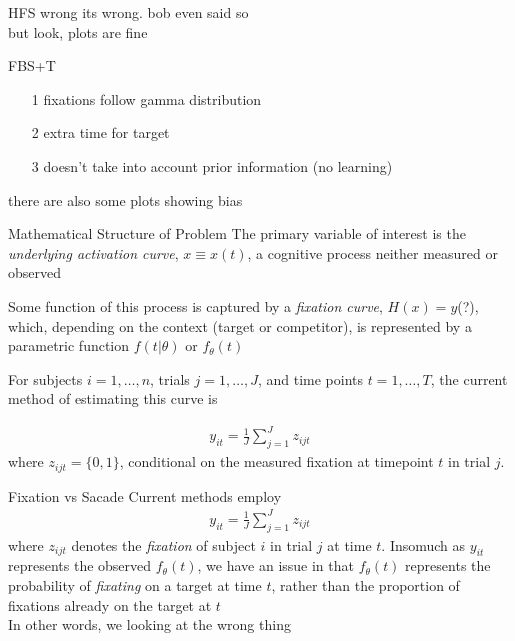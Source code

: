 \documentclass{beamer}
\begin{document}
\begin{frame}{HFS wrong}
its wrong. bob even said so \newline \\

but look, plots are fine
\end{frame}

\begin{frame}{FBS+T}
\begin{enumerate}
  \item[1] fixations follow gamma distribution
  \item[2] extra time for target
  \item[3] doesn't take into account prior information (no learning)
\end{enumerate}
\vspace{5mm}
there are also some plots showing bias
\end{frame}

\begin{frame}{Mathematical Structure of Problem}
The primary variable of interest is the \textit{underlying activation curve}, $x \equiv x(t)$, a cognitive process neither measured or observed \newline

Some function of this process is captured by a \textit{fixation curve}, $H(x) = y$(?), which, depending on the context (target or competitor), is represented by a parametric function $f(t|\theta)$ or $f_{\theta}(t)$ \newline 

For subjects $i = 1, \dots, n$, trials $j = 1, \dots, J$, and time points $t = 1, \dots, T$, the current method of estimating this curve is 

\begin{align*}
y_{it} = \frac{1}{J} \sum_{j=1}^J z_{ijt}
\end{align*}
where $z_{ijt} = \{0,1\}$, conditional on the measured fixation at timepoint $t$ in trial $j$.
\end{frame}



\begin{frame}{Fixation vs Sacade}
Current methods employ
\begin{align*}
y_{it} = \frac1J \sum_{j=1}^J z_{ijt}
\end{align*}
where $z_{ijt}$ denotes the \textit{fixation} of subject $i$ in trial $j$ at time $t$. Insomuch as $y_{it}$ represents the observed $f_{\theta}(t)$, we have an issue in that $f_{\theta}(t)$ represents the probability of \textit{fixating} on a target at time $t$, rather than the proportion of fixations already on the target at $t$ \newline \\

In other words, we looking at the wrong thing
\end{frame}
\end{document}
